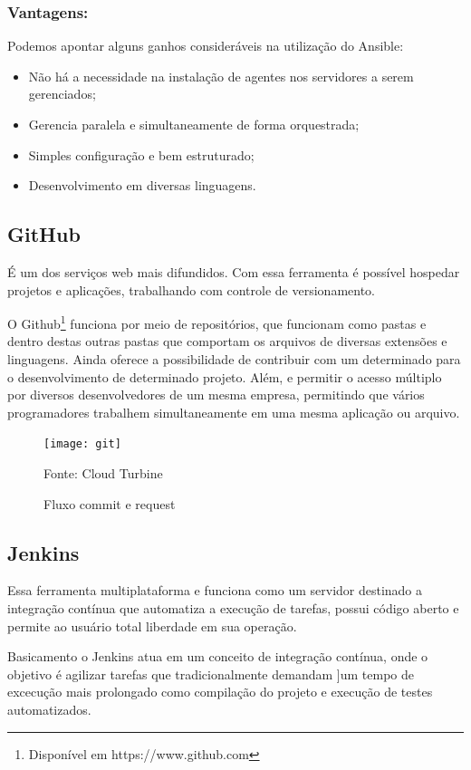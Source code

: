 \subsubsection{Vantagens:}
Podemos apontar alguns ganhos consideráveis na utilização do Ansible:
\begin{itemize}
	\item Não há a necessidade na instalação de agentes nos servidores a serem gerenciados;
	\item Gerencia paralela e simultaneamente de forma orquestrada; 
	\item Simples configuração e bem estruturado;
	\item Desenvolvimento em diversas linguagens.
\end{itemize}

\subsection{GitHub}
É um dos serviços web mais difundidos. Com essa ferramenta é possível hospedar projetos e aplicações, trabalhando com controle de versionamento.

O Github\footnote{Disponível em https://www.github.com} funciona por meio de repositórios, que funcionam como pastas e dentro destas outras pastas que comportam os arquivos de diversas extensões e linguagens. Ainda oferece a possibilidade de contribuir com um determinado para o desenvolvimento de determinado projeto. Além, e permitir o acesso múltiplo por diversos desenvolvedores de um mesma empresa, permitindo que vários programadores trabalhem simultaneamente em uma mesma aplicação ou arquivo.

\begin{figure} [htb]
	\centering
	\texttt{[image: git]}
	\caption{Fluxo commit e request}
	Fonte: Cloud Turbine
	\label{fig:git}
\end{figure}

\subsection{Jenkins}
Essa ferramenta multiplataforma e funciona como um servidor destinado a integração contínua que automatiza a execução de tarefas, possui código aberto e permite ao usuário total liberdade em sua operação.

Basicamento o Jenkins atua em um conceito de integração contínua, onde o objetivo é agilizar tarefas que tradicionalmente demandam ]um tempo de excecução mais prolongado como compilação do projeto e execução de testes automatizados.

